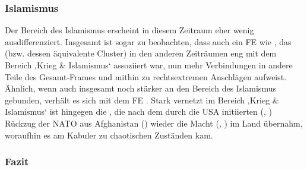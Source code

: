 \subsubsection{Islamismus}\label{islamismus-7}

Der Bereich des Islamismus erscheint in diesem Zeitraum eher wenig ausdifferenziert. Insgesamt ist sogar zu beobachten, dass auch ein FE wie , das (bzw. dessen äquivalente Cluster) in den anderen Zeiträumen eng mit dem Bereich ‚Krieg \& Islamismus` assoziiert war, nun mehr Verbindungen in andere Teile des Gesamt-Frames und mithin zu rechtsextremen Anschlägen aufweist. Ähnlich, wenn auch insgesamt noch stärker an den Bereich des Islamismus gebunden, verhält es sich mit dem FE . Stark vernetzt im Bereich ‚Krieg \& Islamismus` ist hingegen die , die nach dem durch die USA initiierten (, ) Rückzug der NATO aus Afghanistan () wieder die Macht (, ) im Land übernahm, woraufhin es am Kabuler  zu chaotischen Zuständen kam.

\subsubsection{Fazit}\label{fazit-7}

